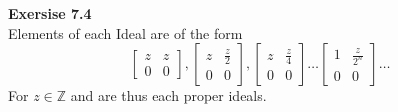 \documentclass[12pt]{article}
\newenvironment{ques}[1]{\textbf{Exersise #1}\vspace{1 mm}\\ }{\bigskip}
\theoremstyle{definition}
\newcommand{\Z}{\mathbb Z}
\begin{document}
\begin{ques}{7.4}
	Elements of each Ideal are of the form
	$$\begin{bmatrix} 
	z & z \\ 
	0 & 0
	\end{bmatrix}
	,
	\begin{bmatrix} 
	z & \frac z 2 \\ 
	0 & 0
	\end{bmatrix}
	,
	\begin{bmatrix} 
	z & \frac z 4 \\ 
	0 & 0
	\end{bmatrix} 
	\dots 
	\begin{bmatrix} 
	1 & \frac z {2^n} \\ 
	0 & 0
	\end{bmatrix}   \dots$$
	For $z \in \Z$ and are thus each proper ideals.
\end{ques}
\end{document}
